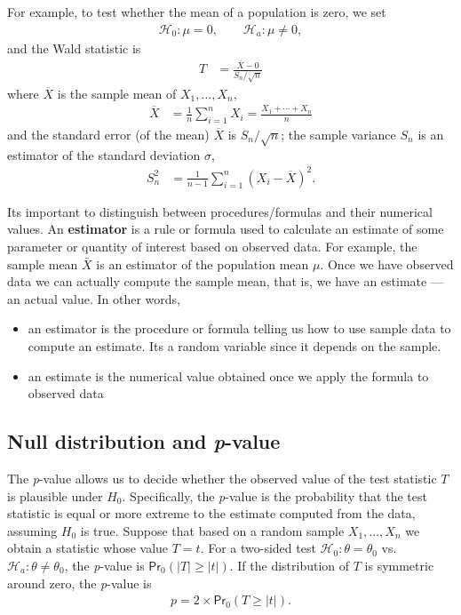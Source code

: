 \documentclass[
  11pt,
  letterpaper,
]{book}
\providecommand{\tightlist}{%
  \setlength{\itemsep}{0pt}\setlength{\parskip}{0pt}}
\theoremstyle{definition}
\theoremstyle{definition}
\theoremstyle{definition}
\theoremstyle{remark}
\begin{document}
For example, to test whether the mean of a population is zero, we set
\begin{align*}
\mathscr{H}_0: \mu=0, \qquad  \mathscr{H}_a:\mu \neq 0, 
\end{align*}
and the Wald statistic is
\begin{align*}
T &= \frac{\overline{X}-0}{S_n/\sqrt{n}}
\end{align*}
where \(\overline{X}\) is the sample mean of \(X_1, \ldots, X_n\),
\begin{align*}
\overline{X} &= \frac{1}{n} \sum_{i=1}^n X_i = \frac{X_1+ \cdots + X_n}{n}
\end{align*}
and the standard error (of the mean) \(\overline{X}\) is \(S_n/\sqrt{n}\); the sample variance \(S_n\) is an estimator of the standard deviation \(\sigma\),
\begin{align*}
S^2_n &= \frac{1}{n-1} \sum_{i=1}^n (X_i-\overline{X})^2.
\end{align*}

Its important to distinguish between procedures/formulas and their numerical values. An \textbf{estimator} is a rule or formula used to calculate an estimate of some parameter or quantity of interest based on observed data. For example, the sample mean \(\bar{X}\) is an estimator of the population mean \(\mu\). Once we have observed data we can actually compute the sample mean, that is, we have an estimate --- an actual value. In other words,

\begin{itemize}
\tightlist
\item
  an estimator is the procedure or formula telling us how to use sample data to compute an estimate. Its a random variable since it depends on the sample.
\item
  an estimate is the numerical value obtained once we apply the formula to observed data
\end{itemize}

\hypertarget{null-distribution-and-p-value}{%
\subsection{\texorpdfstring{Null distribution and \emph{p}-value}{Null distribution and p-value}}\label{null-distribution-and-p-value}}

The \emph{p}-value allows us to decide whether the observed value of the test statistic \(T\) is plausible under \(H_0\). Specifically, the \emph{p}-value is the probability that the test statistic is equal or more extreme to the estimate computed from the data, assuming \(H_0\) is true. Suppose that based on a random sample \(X_1, \ldots, X_n\) we obtain a statistic whose value \(T=t\). For a two-sided test \(\mathscr{H}_0:\theta=\theta_0\) vs.~\(\mathscr{H}_a:\theta \neq \theta_0\), the \emph{p}-value is \(\mathsf{Pr}_0(|T| \geq |t|)\). If the distribution of \(T\) is symmetric around zero, the \emph{p}-value is
\begin{align*}
p = 2 \times \mathsf{Pr}_0(T \geq |t|).
\end{align*}
\end{document}
